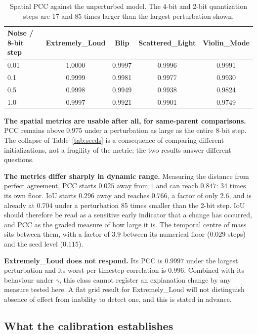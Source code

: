 \begin{table}[htbp]
\centering
\begin{tabular}{lcccc}
\toprule
Noise / 8-bit step & Extremely\_Loud & Blip & Scattered\_Light & Violin\_Mode \\
\midrule
0.01 & 1.0000 & 0.9997 & 0.9996 & 0.9991 \\
0.1  & 0.9999 & 0.9981 & 0.9977 & 0.9930 \\
0.5  & 0.9998 & 0.9949 & 0.9938 & 0.9824 \\
1.0  & 0.9997 & 0.9921 & 0.9901 & 0.9749 \\
\bottomrule
\end{tabular}
\caption{Spatial PCC against the unperturbed model. The 4-bit and 2-bit
quantization steps are 17 and 85 times larger than the largest perturbation
shown.}
\label{tab:perturbation}
\end{table}

\textbf{The spatial metrics are usable after all, for same-parent comparisons.}
PCC remains above $0.975$ under a perturbation as large as the entire 8-bit step.
The collapse of Table~\ref{tab:seeds} is a consequence of comparing different
initializations, not a fragility of the metric; the two results answer different
questions.

\textbf{The metrics differ sharply in dynamic range.} Measuring the distance from
perfect agreement, PCC starts $0.025$ away from $1$ and can reach $0.847$: 34
times its own floor. IoU starts $0.296$ away and reaches $0.766$, a factor of
only $2.6$, and is already at $0.704$ under a perturbation 85 times smaller than
the 2-bit step. IoU should therefore be read as a sensitive early indicator that
a change has occurred, and PCC as the graded measure of how large it is. The
temporal centre of mass sits between them, with a factor of $3.9$ between its
numerical floor ($0.029$ steps) and the seed level ($0.115$).

\textbf{Extremely\_Loud does not respond.} Its PCC is $0.9997$ under the largest
perturbation and its worst per-timestep correlation is $0.996$. Combined with its
behaviour under $\gamma$, this class cannot register an explanation change by any
measure tested here. A flat grid result for Extremely\_Loud will not distinguish
absence of effect from inability to detect one, and this is stated in advance.

\subsection{What the calibration establishes}

